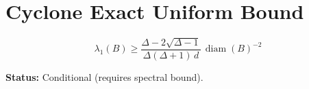 \documentclass{article}
\begin{document}
\section*{Cyclone Exact Uniform Bound}

\[
\lambda_1(B)\ge
\frac{\Delta-2\sqrt{\Delta-1}}{\Delta(\Delta+1)\,d}
\,\operatorname{diam}(B)^{-2}
\]

\textbf{Status:} Conditional (requires spectral bound).
\end{document}
